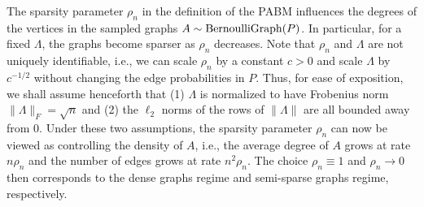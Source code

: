 \documentclass[12pt]{article}
\begin{document}
The sparsity parameter $\rho_n$ in the definition of the PABM
influences the degrees of the vertices in the sampled graphs $A \sim
\mathrm{BernoulliGraph}(P)$. In particular, for a fixed $\Lambda$, the graphs become
sparser as $\rho_n$ decreases. Note that $\rho_n$ and $\Lambda$ are not
uniquely identifiable, i.e., we can scale $\rho_n$ by a constant $c > 0$ and
scale $\Lambda$ by $c^{-1/2}$ without changing the edge probabilities
in $P$. Thus, for ease of exposition, we shall assume henceforth that
(1) $\Lambda$ is normalized to have Frobenius norm $\|\Lambda\|_{F} =
\sqrt{n}$ and (2) the $\ell_2$ norms of the rows of
$\|\Lambda\|$ are all bounded away from $0$. Under these two
assumptions, the sparsity parameter $\rho_n$ can now be viewed as
controlling the density of $A$, i.e., the average degree of
$A$ grows at rate $n \rho_n$ and the number of edges grows at rate
$n^2 \rho_n$. The choice $\rho_n \equiv 1$ and $\rho_n \rightarrow 0$
then corresponds to the dense graphs regime and semi-sparse graphs
regime, respectively. 
\end{document}
